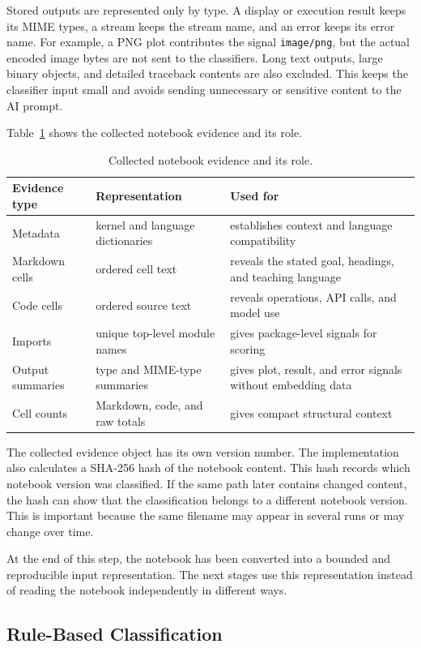 Stored outputs are represented only by type. A display or execution result keeps its MIME types, a stream keeps the stream name, and an error keeps its error name. For example, a PNG plot contributes the signal \texttt{image/png}, but the actual encoded image bytes are not sent to the classifiers. Long text outputs, large binary objects, and detailed traceback contents are also excluded. This keeps the classifier input small and avoids sending unnecessary or sensitive content to the AI prompt.

Table~\ref{tab:classification-features} shows the collected notebook evidence and its role.

\begin{table}[ht]
\centering
\caption{Collected notebook evidence and its role.}
\label{tab:classification-features}
\small
\begin{tabularx}{\textwidth}{@{}p{2.6cm}p{3.6cm}X@{}}
\toprule
Evidence type & Representation & Used for\tabularnewline
\midrule
Metadata & kernel and language dictionaries & establishes context and language compatibility\tabularnewline
Markdown cells & ordered cell text & reveals the stated goal, headings, and teaching language\tabularnewline
Code cells & ordered source text & reveals operations, API calls, and model use\tabularnewline
Imports & unique top-level module names & gives package-level signals for scoring\tabularnewline
Output summaries & type and MIME-type summaries & gives plot, result, and error signals without embedding data\tabularnewline
Cell counts & Markdown, code, and raw totals & gives compact structural context\tabularnewline
\bottomrule
\end{tabularx}
\end{table}

The collected evidence object has its own version number. The implementation also calculates a SHA-256 hash of the notebook content. This hash records which notebook version was classified. If the same path later contains changed content, the hash can show that the classification belongs to a different notebook version. This is important because the same filename may appear in several runs or may change over time.

At the end of this step, the notebook has been converted into a bounded and reproducible input representation. The next stages use this representation instead of reading the notebook independently in different ways.

\subsection{Rule-Based Classification}


